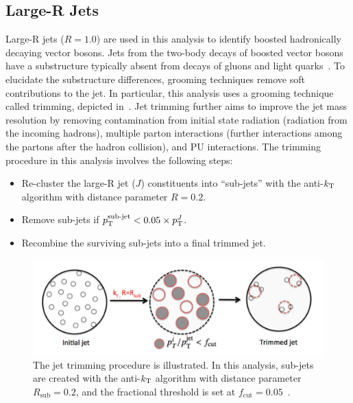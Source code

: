 \subsection{Large-R Jets}
\label{ch:objectReconstruction:larger}
Large-R jets ($R=1.0$) are used in this analysis to identify boosted hadronically decaying vector bosons.  Jets from the two-body decays of boosted vector bosons have a substructure typically absent from decays of gluons and light quarks~\cite{boost_trim}. To elucidate the substructure differences, grooming techniques remove soft contributions to the jet. In particular, this analysis uses a grooming technique called trimming, depicted in~\Fig{\ref{fig:jet_trim}}. Jet trimming further aims to improve the jet mass resolution by removing contamination from initial state radiation (radiation from the incoming hadrons), multiple parton interactions (further interactions among the partons after the hadron collision), and PU interactions. 
The trimming procedure in this analysis involves the following steps:
\begin{itemize}
	\item Re-cluster the large-R jet ($J$) constituents into ``sub-jets'' with the anti-$k_{\rm T}$ algorithm with distance parameter $R=0.2$.
	\item Remove sub-jets if $p_{\rm T}^{\textrm{sub-jet}}< 0.05\times p_{\rm T}^{J}$.
	\item Recombine the surviving sub-jets into a final trimmed jet.
\end{itemize}
\begin{figure}[tbp]
\begin{center}
\includegraphics[width=.8\textwidth]{figures/ObjectReconstruction/jet_trim}
\caption[Jet trimming illustration]{The jet trimming procedure is illustrated. In this analysis, sub-jets are created with the anti-$k_{\rm T}$ algorithm with distance parameter $R_{\textrm{sub}}=0.2$, and the fractional \pT threshold is set at $f_{\textrm{cut}}=0.05$~\cite{boost_trim}.}
\label{fig:jet_trim}
\end{center}
\end{figure}

